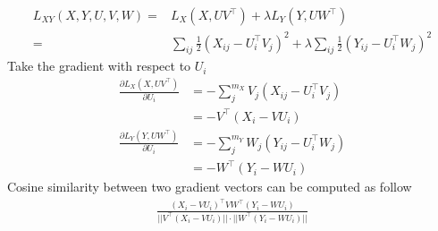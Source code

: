 \documentclass{article} %
\theoremstyle{definition}
\begin{document}
\begin{align}
L_{XY}(X,Y,U,V,W) =& L_X(X, UV^\top) + \lambda L_Y(Y, UW^\top)\\
=& \sum_{ij} \frac{1}{2} (X_{ij} - U_i^\top V_j)^2 + \lambda \sum_{ij} \frac{1}{2} (Y_{ij} - U_i^\top W_j)^2
\end{align}
Take the gradient with respect to $U_i$
\begin{align}
\frac{\partial L_X(X, UV^\top)}{\partial U_i} &= -\sum_j^{m_X} V_j(X_{ij} - U_i^\top V_j)\\
&= - V^\top(X_i - VU_i)\\
\frac{\partial L_Y(Y, UW^\top)}{\partial U_i} &= -\sum_j^{m_Y} W_j(Y_{ij} - U_i^\top W_j)\\
&= - W^\top(Y_i - WU_i)
\end{align}
Cosine similarity between two gradient vectors can be computed as follow 
\begin{align}
\frac{(X_i - VU_i)^\top V W^\top(Y_i - WU_i)}{||V^\top(X_i - VU_i)||\cdot||W^\top(Y_i - WU_i)||}
\end{align}



%
%
\end{document}
